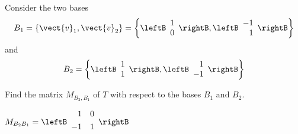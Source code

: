 \begin{enumialphparenastyle}
\begin{ex}
Consider the two bases
\[
B_1 = \left\{ \vect{v}_{1}, \vect{v}_{2} \right\} = \left\{ \leftB \begin{array}{r}
1 \\
0
\end{array}\rightB, \leftB \begin{array}{r}
-1 \\
1
\end{array}
\rightB
\right\}
\]
 and 
\[
B_2 = \left\{ \leftB \begin{array}{r}
1 \\
1
\end{array}
\rightB, \leftB \begin{array}{r}
1 \\
-1
\end{array}
\rightB
\right\}
\]

Find the matrix $M_{B_2,B_1}$ of $T$ with respect to the bases $B_1$ and $B_2$. 
\begin{sol}
$
M_{B_{2} B_{1}} = \leftB
\begin{array}{rr}
\vspace{0.05in}1 & 0 \\
\vspace{0.05in}-1 & 1 
\end{array}
\rightB $
\end{sol}
\end{ex}

\end{enumialphparenastyle}